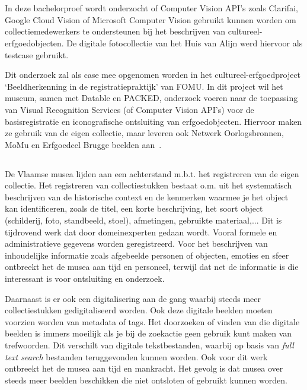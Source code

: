 
\chapter{}
\label{ch:inleiding}
In deze bachelorproef wordt onderzocht of Computer Vision API’s zoals Clarifai, Google Cloud Vision of Microsoft Computer Vision gebruikt kunnen worden om collectiemedewerkers te ondersteunen bij het beschrijven van cultureel-erfgoedobjecten. De digitale fotocollectie van het Huis van Alijn werd hiervoor als testcase gebruikt.

Dit onderzoek zal als case mee opgenomen worden in het cultureel-erfgoedproject ‘Beeldherkenning in de registratiepraktijk’ van FOMU. In dit project wil het museum, samen met Datable en PACKED, onderzoek voeren naar de toepassing van Visual Recognition Services (of Computer Vision API’s) voor de basisregistratie en iconografische ontsluiting van erfgoedobjecten. Hiervoor maken ze gebruik van de eigen collectie, maar leveren ook Netwerk Oorlogsbronnen, MoMu en Erfgoedcel Brugge beelden aan~\autocite{Derveaux2019}.


\section{}
\label{sec:probleemstelling}
De Vlaamse musea lijden aan een achterstand m.b.t. het registreren van de eigen collectie. Het registreren van collectiestukken bestaat o.m. uit het systematisch beschrijven van de historische context en de kenmerken waarmee je het object kan identificeren, zoals de titel, een korte beschrijving, het soort object (schilderij, foto, standbeeld, stoel), afmetingen, gebruikte materiaal,... Dit is tijdrovend werk dat door domeinexperten gedaan wordt. Vooral formele en administratieve gegevens worden geregistreerd. Voor het beschrijven van inhoudelijke informatie zoals afgebeelde personen of objecten, emoties en sfeer ontbreekt het de musea aan tijd en personeel, terwijl dat net de informatie is die interessant is voor ontsluiting en onderzoek.

Daarnaast is er ook een digitalisering aan de gang waarbij steeds meer collectiestukken gedigitaliseerd worden. Ook deze digitale beelden moeten voorzien worden van metadata of tags. Het doorzoeken of vinden van die digitale beelden is immers moeilijk als je bij de zoekactie geen gebruik kunt maken van trefwoorden. Dit verschilt van digitale tekstbestanden, waarbij op basis van \textit{full text search} bestanden teruggevonden kunnen worden. Ook voor dit werk ontbreekt het de musea aan tijd en mankracht. Het gevolg is dat musea over steeds meer beelden beschikken die niet ontsloten of gebruikt kunnen worden. 

